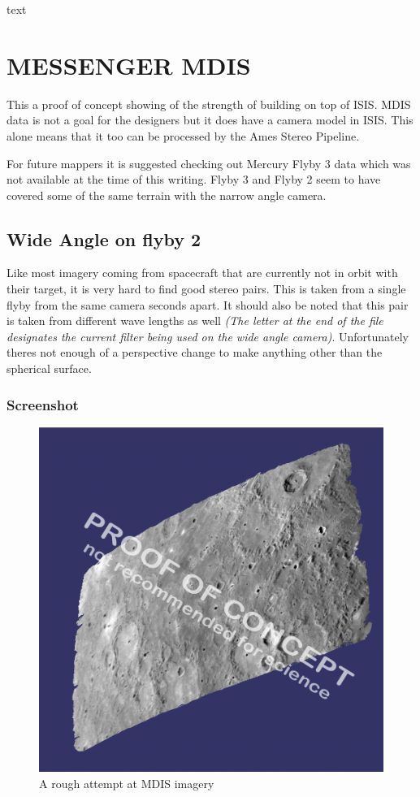 text

\section{MESSENGER MDIS}

This a proof of concept showing of the strength of building on top of
ISIS. MDIS data is not a goal for the designers but it does have a
camera model in ISIS. This alone means that it too can be processed by
the Ames Stereo Pipeline.

For future mappers it is suggested checking out Mercury Flyby 3 data
which was not available at the time of this writing. Flyby 3 and Flyby
2 seem to have covered some of the same terrain with the narrow angle
camera.

\subsection{Wide Angle on flyby 2}

Like most imagery coming from spacecraft that are currently not in
orbit with their target, it is very hard to find good stereo
pairs. This is taken from a single flyby from the same camera seconds
apart. It should also be noted that this pair is taken from different
wave lengths as well \emph{(The letter at the end of the file
  designates the current filter being used on the wide angle
  camera)}. Unfortunately theres not enough of a perspective change to
make anything other than the spherical surface.

\subsubsection*{Screenshot}

\begin{figure}[h!]
  \begin{center}
  \includegraphics[width=5in]{images/examples/mdis/mdis_wide_example.png}
  \end{center}
  \caption{ A rough attempt at MDIS imagery }
  \label{fig:mdis_attempt}
\end{figure}


